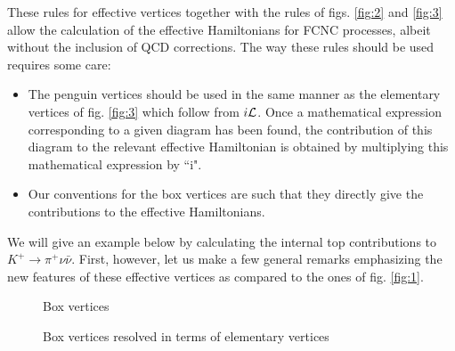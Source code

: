 \documentclass[12pt,rotate]{article}
\newcommand{\bi}{\begin{itemize}}
\newcommand{\ei}{\end{itemize}}
\begin{document}
\begin{itemize}
These rules for effective vertices
together with the rules of figs. \ref{fig:2} and \ref{fig:3}  allow 
the calculation of
the effective Hamiltonians for FCNC processes, albeit without the inclusion
of QCD corrections. The way these rules should be used requires  some care:
\bi
\item
 The penguin vertices should be used in the same manner as the
elementary vertices of fig. \ref{fig:3} which follow from $i {\cal L}$. 
Once a
mathematical expression corresponding to a given diagram has been found,
the contribution of this diagram to the relevant effective Hamiltonian
is obtained by multiplying this mathematical expression by ``i". 
\item
Our conventions for the box vertices are such that they directly 
give the contributions to the effective Hamiltonians. 
\ei
We will give an
example below by calculating the internal top contributions to 
$K^+\to \pi^+\nu\bar\nu$.
First, however, let us make a few
general remarks emphasizing the new features of these effective
vertices as compared to the ones of fig. \ref{fig:1}.
\begin{figure}[hbt]
\centerline{
\epsfysize=1.6in
}
\caption[]{
Box vertices 
\label{fig:6}}
\end{figure}   

\begin{figure}[hbt]
\centerline{
\epsfysize=3.2in
}
\caption[]{
Box vertices resolved in terms of elementary vertices
\label{fig:7}}
\end{figure}


\end{itemize}
\end{document}
